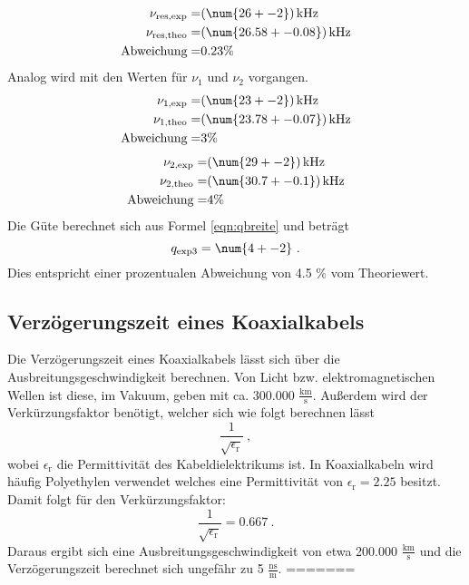 \begin{eqnarray}
  \nu_\text{res,exp} =&  (\num{26 +- 2}) \, \text{kHz}			\\
  \nu_\text{res,theo} =& (\num{26.58 +- 0.08}) \, \text{kHz} \\
  \text{Abweichung} =& 0.23 \%
  \label{eqn:res}
\end{eqnarray}
Analog wird mit den Werten für $\nu_1$ und $\nu_2$ vorgangen.
\begin{eqnarray}
  \nu_\text{1,exp} =&  (\num{23 +- 2}) \, \text{kHz}                 \\
  \nu_\text{1,theo} =& (\num{23.78 +- 0.07}) \, \text{kHz} \\
  \text{Abweichung} =& 3 \%
\end{eqnarray}
\begin{eqnarray}
  \nu_\text{2,exp} =&  (\num{29 +- 2}) \, \text{kHz}                 \\
  \nu_\text{2,theo} =& (\num{30.7 +- 0.1}) \, \text{kHz} \\
  \text{Abweichung} =& 4 \%
\end{eqnarray}
Die Güte berechnet sich aus Formel \ref{eqn:qbreite} und beträgt
\begin{equation}
  q_\text{exp3} = \num{4 +- 2}  \ .
  \label{eqn:q3}
\end{equation}
Dies entspricht einer prozentualen Abweichung von 4.5 \% vom Theoriewert.

\subsection{Verzögerungszeit eines Koaxialkabels}
Die Verzögerungszeit eines Koaxialkabels lässt sich über die Ausbreitungsgeschwindigkeit berechnen. Von Licht bzw. elektromagnetischen Wellen ist diese, im Vakuum, geben mit ca. 300.000 $\frac{\text{km}}{\text{s}}$. Außerdem wird der Verkürzungsfaktor benötigt, welcher sich wie folgt berechnen lässt
\begin{equation*}
  \frac{1}{\sqrt{\epsilon_\text{r}}} \ ,
\end{equation*}
wobei $\epsilon_\text{r}$ die Permittivität des Kabeldielektrikums ist.
In Koaxialkabeln wird häufig Polyethylen verwendet welches eine Permittivität von $\epsilon_\text{r} = 2.25$ besitzt. Damit folgt für den Verkürzungsfaktor:
\begin{equation*}
  \frac{1}{\sqrt{\epsilon_\text{r}}} = 0.667 \ .
\end{equation*}
Daraus ergibt sich eine Ausbreitungsgeschwindigkeit von etwa 200.000 $\frac{\text{km}}{\text{s}}$ und die Verzögerungszeit berechnet sich ungefähr zu 5 $\frac{\text{ns}}{\text{m}}$.
=======
